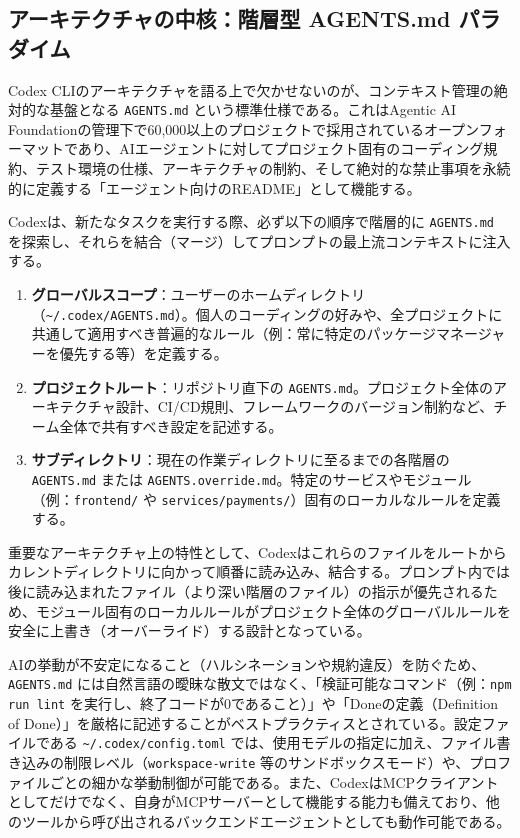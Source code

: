 \documentclass[a4paper,11pt]{ltjsarticle}
\newcommand{\cmd}[1]{\texttt{#1}}
\newcommand{\home}{\textasciitilde}
\begin{document}
\subsection{アーキテクチャの中核：階層型 AGENTS.md パラダイム}

Codex CLIのアーキテクチャを語る上で欠かせないのが、コンテキスト管理の絶対的な基盤となる \cmd{AGENTS.md} という標準仕様である。これはAgentic AI Foundationの管理下で60,000以上のプロジェクトで採用されているオープンフォーマットであり、AIエージェントに対してプロジェクト固有のコーディング規約、テスト環境の仕様、アーキテクチャの制約、そして絶対的な禁止事項を永続的に定義する「エージェント向けのREADME」として機能する\cite{r43}。

Codexは、新たなタスクを実行する際、必ず以下の順序で階層的に \cmd{AGENTS.md} を探索し、それらを結合（マージ）してプロンプトの最上流コンテキストに注入する\cite{r46}。

\begin{enumerate}
\item \textbf{グローバルスコープ}：ユーザーのホームディレクトリ（\cmd{\home/.codex/AGENTS.md}）。個人のコーディングの好みや、全プロジェクトに共通して適用すべき普遍的なルール（例：常に特定のパッケージマネージャーを優先する等）を定義する\cite{r45}。
\item \textbf{プロジェクトルート}：リポジトリ直下の \cmd{AGENTS.md}。プロジェクト全体のアーキテクチャ設計、CI/CD規則、フレームワークのバージョン制約など、チーム全体で共有すべき設定を記述する\cite{r45}。
\item \textbf{サブディレクトリ}：現在の作業ディレクトリに至るまでの各階層の \cmd{AGENTS.md} または \cmd{AGENTS.override.md}。特定のサービスやモジュール（例：\cmd{frontend/} や \cmd{services/payments/}）固有のローカルなルールを定義する\cite{r45}。
\end{enumerate}

重要なアーキテクチャ上の特性として、Codexはこれらのファイルをルートからカレントディレクトリに向かって順番に読み込み、結合する。プロンプト内では後に読み込まれたファイル（より深い階層のファイル）の指示が優先されるため、モジュール固有のローカルルールがプロジェクト全体のグローバルルールを安全に上書き（オーバーライド）する設計となっている\cite{r46}。

AIの挙動が不安定になること（ハルシネーションや規約違反）を防ぐため、\cmd{AGENTS.md} には自然言語の曖昧な散文ではなく、「検証可能なコマンド（例：\cmd{npm run lint} を実行し、終了コードが0であること）」や「Doneの定義（Definition of Done）」を厳格に記述することがベストプラクティスとされている\cite{r43}。設定ファイルである \cmd{\home/.codex/config.toml} では、使用モデルの指定に加え、ファイル書き込みの制限レベル（\cmd{workspace-write} 等のサンドボックスモード）や、プロファイルごとの細かな挙動制御が可能である\cite{r36}。また、CodexはMCPクライアントとしてだけでなく、自身がMCPサーバーとして機能する能力も備えており、他のツールから呼び出されるバックエンドエージェントとしても動作可能である\cite{r18}。
\end{document}
